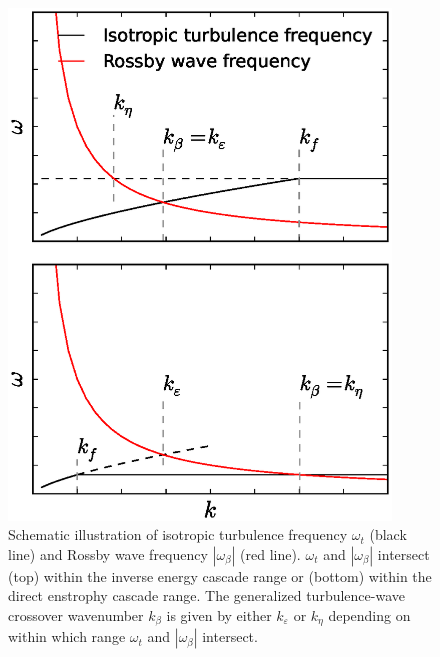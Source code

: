 \documentclass{ametsoc}
\begin{document}
\begin{figure}
\begin{center}
\includegraphics[width=4in]{crossover_scale_illustrate}\caption{Schematic illustration of isotropic turbulence frequency $\omega_{t}$
(black line) and Rossby wave frequency $|\omega_{\beta}|$ (red line).
$\omega_{t}$ and $|\omega_{\beta}|$ intersect (top) within the
inverse energy cascade range or (bottom) within the direct enstrophy
cascade range. The generalized turbulence-wave crossover wavenumber
$k_{\beta}$ is given by either $k_{\varepsilon}$ or $k_{\eta}$
depending on within which range $\omega_{t}$ and $|\omega_{\beta}|$ intersect.}
\label{crossover_illustrate}
\end{center}
\end{figure}
\end{document}

